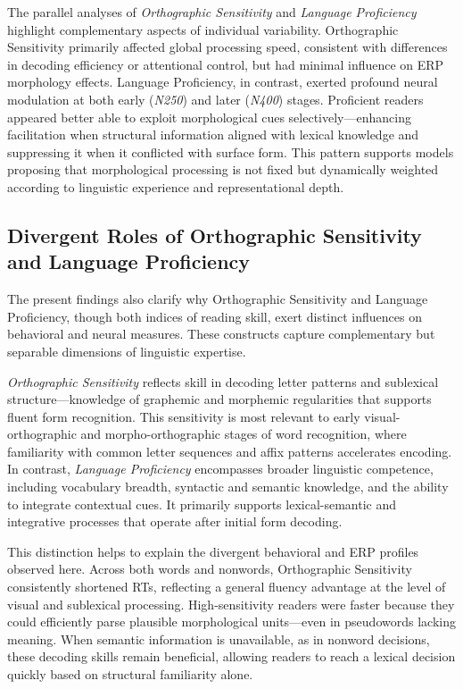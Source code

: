 \documentclass[preprint,12pt, authoryear, review]{elsarticle}
\begin{document}
The parallel analyses of \textit{Orthographic Sensitivity} and \textit{Language Proficiency} highlight complementary aspects of individual variability. Orthographic Sensitivity primarily affected global processing speed, consistent with differences in decoding efficiency or attentional control, but had minimal influence on ERP morphology effects. Language Proficiency, in contrast, exerted profound neural modulation at both early (\textit{N250}) and later (\textit{N400}) stages. Proficient readers appeared better able to exploit morphological cues selectively—enhancing facilitation when structural information aligned with lexical knowledge and suppressing it when it conflicted with surface form. This pattern supports models proposing that morphological processing is not fixed but dynamically weighted according to linguistic experience and representational depth.

\subsection{Divergent Roles of Orthographic Sensitivity and Language Proficiency}

The present findings also clarify why Orthographic Sensitivity and Language Proficiency, though both indices of reading skill, exert distinct influences on behavioral and neural measures. These constructs capture complementary but separable dimensions of linguistic expertise. 

\textit{Orthographic Sensitivity} reflects skill in decoding letter patterns and sublexical structure—knowledge of graphemic and morphemic regularities that supports fluent form recognition. This sensitivity is most relevant to early visual-orthographic and morpho-orthographic stages of word recognition, where familiarity with common letter sequences and affix patterns accelerates encoding. In contrast, \textit{Language Proficiency} encompasses broader linguistic competence, including vocabulary breadth, syntactic and semantic knowledge, and the ability to integrate contextual cues. It primarily supports lexical-semantic and integrative processes that operate after initial form decoding.

This distinction helps to explain the divergent behavioral and ERP profiles observed here. Across both words and nonwords, Orthographic Sensitivity consistently shortened RTs, reflecting a general fluency advantage at the level of visual and sublexical processing. High-sensitivity readers were faster because they could efficiently parse plausible morphological units—even in pseudowords lacking meaning. When semantic information is unavailable, as in nonword decisions, these decoding skills remain beneficial, allowing readers to reach a lexical decision quickly based on structural familiarity alone.
\end{document}
